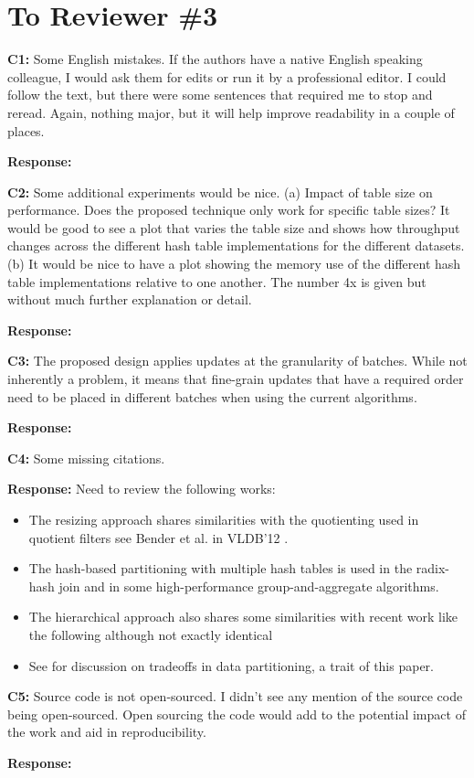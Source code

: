 \section*{To Reviewer \#3}

\begin{shaded}
	\noindent\textbf{C1:} Some English mistakes.  If the authors have a native English speaking colleague, I would ask them for edits or run it by a professional editor.  I could follow the text, but there were some sentences that required me to stop and reread.  Again, nothing major, but it will help improve readability in a couple of places.
\end{shaded}
%
\noindent\textbf{Response:} 

\begin{shaded}
	\noindent\textbf{C2:} Some additional experiments would be nice.
	(a) Impact of table size on performance.  Does the proposed technique only work for specific table sizes?  It would be good to see a plot that varies the table size and shows how throughput changes across the different hash table implementations for the different datasets.
	(b) It would be nice to have a plot showing the memory use of the different hash table implementations relative to one another.  The number 4x is given but without much further explanation or detail.
\end{shaded}
%
\noindent\textbf{Response:} 

\begin{shaded}
	\noindent\textbf{C3:} The proposed design applies updates at the granularity of batches.  While not inherently a problem, it means that fine-grain updates that have a required order need to be placed in different batches when using the current algorithms.
\end{shaded}
%
\noindent\textbf{Response:} 

\begin{shaded}
	\noindent\textbf{C4:} Some missing citations. 	
\end{shaded}
%
\noindent\textbf{Response:} 
Need to review the following works: 
\begin{itemize}
	\item The resizing approach shares similarities with the quotienting used in quotient filters see Bender et al. in VLDB'12 \cite{bender2012don}.  
	\item The hash-based partitioning with multiple hash tables is used in the radix-hash join \cite{bender2012don} and in some high-performance group-and-aggregate algorithms.  
	\item The hierarchical approach also shares some similarities with recent work like the following although not exactly identical \cite{zuo2018write}
	\item See \cite{zhang2019data} for discussion on tradeoffs in data partitioning, a trait of this paper.
\end{itemize}

\begin{shaded}
	\noindent\textbf{C5:} Source code is not open-sourced.  I didn't see any mention of the source code being open-sourced.  Open sourcing the code would add to the potential impact of the work and aid in reproducibility.
\end{shaded}
%
\noindent\textbf{Response:} 